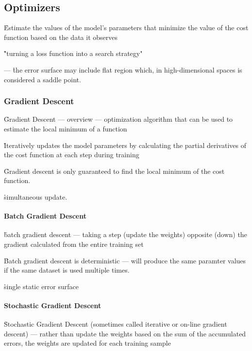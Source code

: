 \subsection{Optimizers}

\r{Estimate the values of the model's parameters that minimize the value of the cost function based on the data it observes}

\r{"turning a loss function into a search strategy"}


 --- \r{the error surface may include flat region which, in high-dimensional spaces is considered a saddle point.}

\subsubsection{Gradient Descent}

\r{Gradient Descent --- overview --- optimization algorithm that can be used to estimate the local minimum of a function}

\r{Iteratively updates the model parameters by calculating the partial derivatives of the cost function at each step during training}

\r{Gradient descent is only guaranteed to find the local minimum of the cost function.}

\r{simultaneous update.}


\paragraph{Batch Gradient Descent}

\r{batch gradient descent --- taking a step (update the weights) opposite (down) the gradient calculated from the entire training set}

\r{Batch gradient descent is deterministic --- will produce the same paramter values if the same dataset is used multiple times.}

\r{single static error surface}


\paragraph{Stochastic Gradient Descent}

\r{Stochastic Gradient Descent (sometimes called iterative or on-line gradient descent) --- rather than update the weights based on the sum of the accumulated errors, the weights are updated for each training sample}

